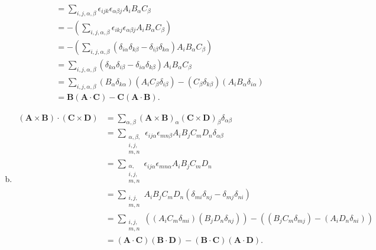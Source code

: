 \documentclass[10pt]{mypackage}
\begin{document}
\begin{enumerate}[(a)]
\begin{align*}
                                                                &= \sum_{i,j,\alpha,\beta}\epsilon_{ijk}\epsilon_{\alpha\beta j}A_{i} B_{\alpha}C_{\beta}\\
                                                                &= -\left(\sum_{i,j,\alpha,\beta}\epsilon_{ikj}\epsilon_{\alpha \beta j}A_{i}B_{\alpha}C_{\beta}\right)\\
                                                                &= -\left(\sum_{i,j,\alpha,\beta}\left(\delta_{i\alpha}\delta_{k\beta} - \delta_{i\beta}\delta_{k\alpha}\right)A_{i}B_{\alpha}C_{\beta}\right)\\
                                                                &= \sum_{i,j,\alpha,\beta}\left(\delta_{k\alpha}\delta_{i\beta} - \delta_{i\alpha}\delta_{k\beta}\right)A_iB_{\alpha}C_{\beta}\\
                                                                &= \sum_{i,j,\alpha,\beta}\left(B_{\alpha}\delta_{k\alpha}\right)\left(A_{i}C_{\beta}\delta_{i\beta}\right) - \left(C_{\beta}\delta_{k\beta}\right)\left(A_{i}B_{\alpha}\delta_{i\alpha}\right)\\
                                                                &= \mathbf{B}\left(\mathbf{A}\cdot \mathbf{C}\right) - \mathbf{C}\left(\mathbf{A}\cdot \mathbf{B}\right).
    \end{align*}
  \item 
    \begin{align*}
      \left(\mathbf{A}\times \mathbf{B}\right)\cdot \left(\mathbf{C}\times \mathbf{D}\right) &= \sum_{\alpha,\beta}\left(\mathbf{A}\times \mathbf{B}\right)_{\alpha}\left(\mathbf{C}\times \mathbf{D}\right)_{\beta}\delta_{\alpha\beta}\\
                  &= \sum_{\substack{\alpha,\beta,\\i,j,\\m,n}}\epsilon_{ij\alpha}\epsilon_{mn\beta}A_iB_jC_mD_n\delta_{\alpha\beta}\\
                  &= \sum_{\substack{\alpha,\\i,j,\\m,n}}\epsilon_{ij\alpha}\epsilon_{mn\alpha}A_iB_jC_mD_n\\
                  &= \sum_{\substack{i,j,\\m,n}}A_iB_jC_mD_n\left(\delta_{mi}\delta_{nj} - \delta_{mj}\delta_{ni}\right)\\
                  &= \sum_{\substack{i,j,\\m,n}}\left(\left(A_iC_m\delta_{mi}\right)\left(B_jD_n\delta_{nj}\right)\right) - \left(\left(B_jC_m\delta_{mj}\right) - \left(A_iD_n\delta_{ni}\right)\right)\\
                  &= \left(\mathbf{A}\cdot \mathbf{C}\right)\left(\mathbf{B}\cdot \mathbf{D}\right) - \left(\mathbf{B}\cdot \mathbf{C}\right)\left(\mathbf{A}\cdot \mathbf{D}\right).
    \end{align*}
\end{enumerate}
\end{document}
